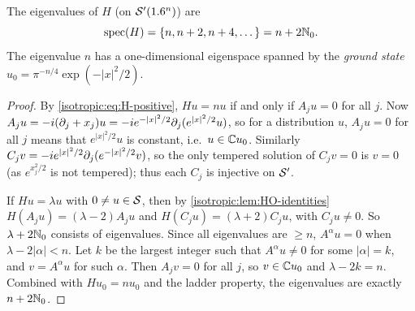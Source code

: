 \begin{proposition}\label{isotropic:prop:HO-spectrum}
The eigenvalues of $H$ (on $\mathcal{S}'(1.6^n)$) are
\begin{equation*}
  \operatorname{spec}(H)=\{n,n+2,n+4,\dots\}=n+2\mathbb{N}_0 .
\end{equation*}
The eigenvalue $n$ has a one-dimensional eigenspace spanned by the
\emph{ground state} $u_0=\pi^{-n/4}\exp(-|x|^2/2)$.
\end{proposition}
\begin{proof}
By \eqref{isotropic:eq:H-positive}, $Hu=nu$ if and only if $A_ju=0$ for all
$j$. Now $A_ju=-i(\partial_j+x_j)u=-ie^{-|x|^2/2}\partial_j(e^{|x|^2/2}u)$, so for a
distribution $u$, $A_ju=0$ for all $j$ means that $e^{|x|^2/2}u$ is constant,
i.e.\ $u\in\mathbb{C} u_0$. Similarly $C_jv=-ie^{|x|^2/2}\partial_j(e^{-|x|^2/2}v)$, so the
only tempered solution of $C_jv=0$ is $v=0$ (as $e^{x_j^2/2}$ is not tempered);
thus each $C_j$ is injective on $\mathcal{S}'$.

If $Hu=\lambda u$ with $0\ne u\in\mathcal{S}$, then by \cref{isotropic:lem:HO-identities}
$H(A_ju)=(\lambda-2)A_ju$ and $H(C_ju)=(\lambda+2)C_ju$, with $C_ju\ne0$. So
$\lambda+2\mathbb{N}_0$ consists of eigenvalues. Since all eigenvalues are $\ge n$,
$A^\alpha u=0$ when $\lambda-2|\alpha|<n$. Let $k$ be the largest integer such
that $A^\alpha u\ne0$ for some $|\alpha|=k$, and $v=A^\alpha u$ for such
$\alpha$. Then $A_jv=0$ for all $j$, so $v\in\mathbb{C} u_0$ and $\lambda-2k=n$.
Combined with $Hu_0=nu_0$ and the ladder property, the eigenvalues are
exactly $n+2\mathbb{N}_0$.
\end{proof}

